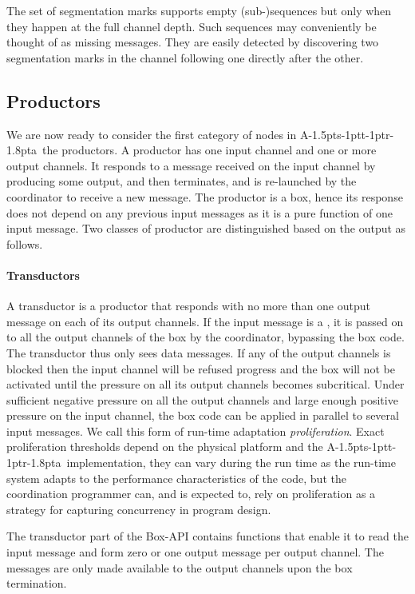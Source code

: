 \documentclass[11pt]{report}
\def\ak{{\textsf{A\kern-1.5pts\kern-1ptt\kern-1ptr\kern-1.8pta}}\kern-2pt{\it K\kern-2ptahn}}
\begin{document}
The set of segmentation marks supports empty (sub-)sequences but only when they happen at the full channel depth. Such sequences
may conveniently be thought of as missing messages. They are easily detected by discovering two segmentation marks in the channel
following one directly after the other.

\subsection{Productors}

We are now ready to consider the first category of nodes in \ak\, the productors. A productor has one input channel and one or more output channels.
It responds to a message received on the input channel by producing some output, and then terminates, and is re-launched by the coordinator
to receive a new message. The productor is a box, hence its response does not depend on any previous input messages as it is a pure function
of one input message. Two classes of productor are distinguished based on the output as follows.

\paragraph{Transductors}
A transductor is a productor that responds with no more than one output message on each of its output channels. If the input message is a ,
it is passed on to all the output channels of the box by the coordinator, bypassing the box code.
The transductor thus only sees data messages. If any of the output channels
is blocked then the input channel will be refused progress and the box will not be activated until the pressure on all its output channels becomes subcritical.
Under sufficient negative pressure on all the output channels and large enough positive pressure on the input channel, the box code can be applied
in parallel to several input messages. We call this form of run-time adaptation {\em proliferation}. Exact proliferation thresholds
depend on the physical platform and the \ak\ implementation, they can vary during the run time as the run-time system adapts
to the performance characteristics of the code, but the coordination programmer can, and is expected to, rely on proliferation
as a strategy for capturing concurrency in program design.

The transductor part of the Box-API contains functions that enable it to read the input message and form zero or one output message
per output channel. The messages are only made available to the output channels upon the box termination.
\end{document}
